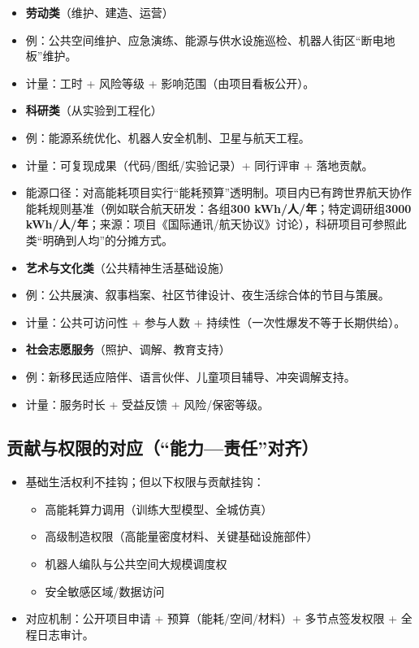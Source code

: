 \begin{itemize}
\item
  \textbf{劳动类}（维护、建造、运营）
\item
  例：公共空间维护、应急演练、能源与供水设施巡检、机器人街区``断电地板''维护。
\item
  计量：工时 + 风险等级 + 影响范围（由项目看板公开）。
\item
  \textbf{科研类}（从实验到工程化）
\item
  例：能源系统优化、机器人安全机制、卫星与航天工程。
\item
  计量：可复现成果（代码/图纸/实验记录）+ 同行评审 + 落地贡献。
\item
  能源口径：对高能耗项目实行``能耗预算''透明制。项目内已有跨世界航天协作能耗规则基准（例如联合航天研发：各组\textbf{300 kWh/人/年}；特定调研组\textbf{3000 kWh/人/年}；来源：项目《国际通讯/航天协议》讨论），科研项目可参照此类``明确到人均''的分摊方式。
\item
  \textbf{艺术与文化类}（公共精神生活基础设施）
\item
  例：公共展演、叙事档案、社区节律设计、夜生活综合体的节目与策展。
\item
  计量：公共可访问性 + 参与人数 + 持续性（一次性爆发不等于长期供给）。
\item
  \textbf{社会志愿服务}（照护、调解、教育支持）
\item
  例：新移民适应陪伴、语言伙伴、儿童项目辅导、冲突调解支持。
\item
  计量：服务时长 + 受益反馈 + 风险/保密等级。
\end{itemize}

\subsection{贡献与权限的对应（``能力---责任''对齐）}\label{ux8d21ux732eux4e0eux6743ux9650ux7684ux5bf9ux5e94ux80fdux529bux8d23ux4efbux5bf9ux9f50}

\begin{itemize}
\item
  基础生活权利不挂钩；但以下权限与贡献挂钩：

  \begin{itemize}
  \item
    高能耗算力调用（训练大型模型、全城仿真）
  \item
    高级制造权限（高能量密度材料、关键基础设施部件）
  \item
    机器人编队与公共空间大规模调度权
  \item
    安全敏感区域/数据访问
  \end{itemize}
\item
  对应机制：公开项目申请 + 预算（能耗/空间/材料）+ 多节点签发权限 + 全程日志审计。

\end{itemize}

